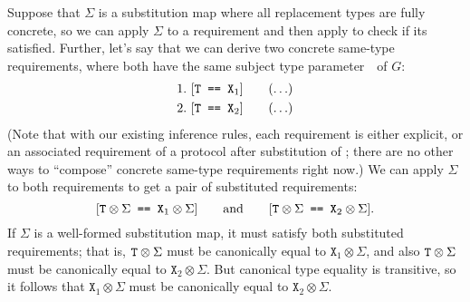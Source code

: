\documentclass[../generics]{subfiles}
\begin{document}
Suppose that $\Sigma$ is a substitution map where all replacement types are fully concrete, so we can apply $\Sigma$ to a requirement and then apply  to check if its satisfied. Further, let's say that we can derive two concrete same-type requirements, where both have the same subject type parameter~\tT\ of $G$:
\begin{gather*}
\AnyStep{\SameReq{T}{$\texttt{X}_1$}}{1}\\
\AnyStep{\SameReq{T}{$\texttt{X}_2$}}{2}
\end{gather*}
(Note that with our existing inference rules, each requirement is either explicit, or an associated requirement of a protocol after substitution of \tSelf; there are no other ways to ``compose'' concrete same-type requirements right now.) We can apply $\Sigma$ to both requirements to get a pair of substituted requirements:
\[ [\texttt{$\texttt{T}\otimes\Sigma$ == $\texttt{X}_1\otimes\Sigma$}]\qquad\text{and}\qquad
   [\texttt{$\texttt{T}\otimes\Sigma$ == $\texttt{X}_2\otimes\Sigma$}]. \]
If $\Sigma$ is a well-formed substitution map, it must satisfy both substituted requirements; that is, $\texttt{T}\otimes\Sigma$ must be canonically equal to $\texttt{X}_1\otimes\Sigma$, and also $\texttt{T}\otimes\Sigma$ must be canonically equal to $\texttt{X}_2\otimes\Sigma$. But canonical type equality is transitive, so it follows that $\texttt{X}_1\otimes\Sigma$ must be canonically equal to $\texttt{X}_2\otimes\Sigma$.
\end{document}

